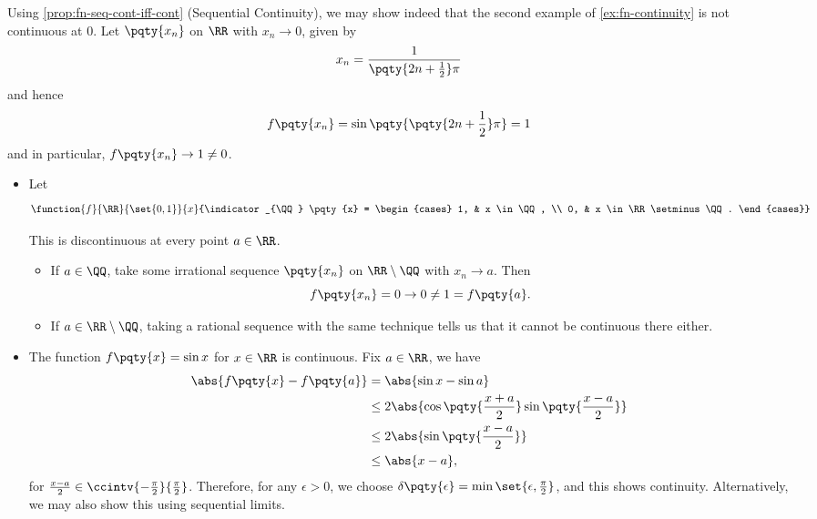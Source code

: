 Using \autoref{prop:fn-seq-cont-iff-cont} (Sequential Continuity), we may show indeed that the second example of \autoref{ex:fn-continuity} is not continuous at \(0\). Let \(\pqty{x_n}\) on \(\RR\) with \(x_n \to 0\), given by
\[
    x_n = \frac{1}{\pqty{2n + \frac{1}{2}} \pi}
\]
and hence
\[
    f\pqty{x_n} = \sin\pqty{\pqty{2n + \frac{1}{2}} \pi} = 1
\]
and in particular, \(f\pqty{x_n} \to 1 \neq 0\).

\begin{examples}
    \label{ex:continuity-continued}%
    \begin{itemize}
        \item Let
        \[
            \function{f}{\RR}{\set{0, 1}}
            {x}{\indicator_{\QQ} \pqty{x} = \begin{cases}
                1, & x \in \QQ, \\
                0, & x \in \RR \setminus \QQ.
            \end{cases}}
        \]

        This is discontinuous at every point \(a \in \RR\).

        \begin{itemize}
            \item If \(a \in \QQ\), take some irrational sequence \(\pqty{x_n}\) on \(\RR \setminus \QQ\) with \(x_n \to a\). Then
            \[
                f\pqty{x_n} = 0 \to 0 \neq 1 = f\pqty{a}.
            \]
            \item If \(a \in \RR \setminus \QQ\), taking a rational sequence with the same technique tells us that it cannot be continuous there either.
        \end{itemize}

        \item The function \(f\pqty{x} = \sin x\) for \(x \in \RR\) is continuous. Fix \(a \in \RR\), we have
        \begin{align*}
            \abs{f\pqty{x} - f\pqty{a}} &= \abs{\sin x - \sin a} \\
            &\leq 2 \abs{\cos \pqty{\frac{x + a}{2}} \sin \pqty{\frac{x - a}{2}}} \\
            &\leq 2 \abs{\sin \pqty{\frac{x - a}{2}}} \\
            &\leq \abs{x - a},
        \end{align*}
        for \(\frac{x - a}{2} \in \ccintv{-\frac{\pi}{2}}{\frac{\pi}{2}}\). Therefore, for any \(\epsilon > 0\), we choose \(\delta\pqty{\epsilon} = \min\set{\epsilon, \frac{\pi}{2}}\), and this shows continuity. Alternatively, we may also show this using sequential limits.
    \end{itemize}
\end{examples}

